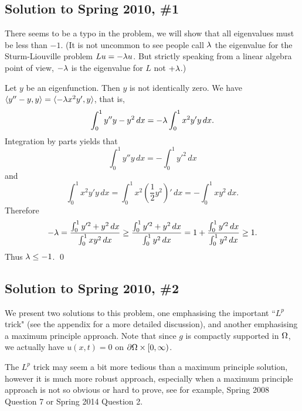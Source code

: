 \subsection*{Solution to Spring 2010, \#1}\label{s101}
There seems to be a typo in the problem, we will show that all eigenvalues must
be less than $-1$. (It is not uncommon to see people call $\lambda$ the
eigenvalue for the Sturm-Liouville problem $Lu = -\lambda u$. But strictly speaking
from a linear algebra point of view, $-\lambda$ is the eigenvalue for $L$ not $+\lambda$.)

Let $y$ be an eigenfunction. Then $y$ is not identically zero. We have
$\langle y'' - y, y \rangle = \langle -\lambda x^{2}y', y \rangle$, that is,
$$\int_{0}^{1}y''y - y^{2}\, dx = -\lambda \int_{0}^{1}x^{2}y'y\, dx.$$
Integration by parts yields that
$$\int_{0}^{1}y''y\, dx = -\int_{0}^{1}y'^{2}\, dx$$
and
$$\int_{0}^{1}x^{2}y'y\, dx = \int_{0}^{1}x^{2}(\frac{1}{2}y^{2})'\, dx = -\int_{0}^{1}xy^{2}\, dx.$$
Therefore
\begin{align*}
-\lambda = \frac{\int_{0}^{1}y'^{2} + y^{2}\, dx}{\int_{0}^{1}xy^{2}\, dx} \geq \frac{\int_{0}^{1}y'^{2} + y^{2}\, dx}{\int_{0}^{1}y^{2}\, dx} = 1 + \frac{\int_{0}^{1}y'^{2}\, dx}{\int_{0}^{1}y^{2}\, dx} \geq 1.
\end{align*}
Thus $\lambda \leq -1$.
\hfill\qed

\subsection*{Solution to Spring 2010, \#2}\label{s102}
We present two solutions to this problem, one emphasising the important ``$L^{p}$ trick" (see the appendix for a more detailed discussion),
and another emphasising a maximum principle approach. Note that since $g$ is compactly supported in $\Omega$, we actually have
$u(x, t) = 0$ on $\partial \Omega \times [0, \infty)$.

\begin{rem}
The $L^{p}$ trick may seem a bit more tedious than a maximum principle solution, however it is much more robust approach, especially when a
maximum principle approach is not so obvious or hard to prove, see for example, Spring 2008 Question 7 or Spring 2014 Question 2.
\end{rem}

